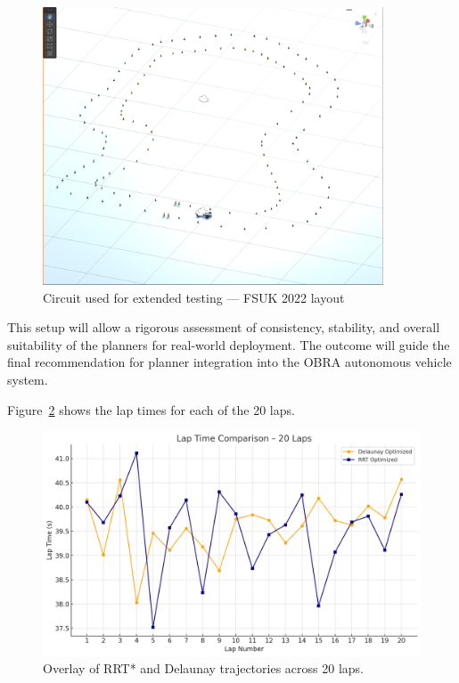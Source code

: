 \documentclass[a4paper,11pt]{report}
\begin{document}
\begin{figure}[H]
    \centering
    \includegraphics[width=0.90\textwidth]{Images/Track.png}
    \caption{Circuit used for extended testing — FSUK 2022 layout}
    \label{fig:track}
\end{figure}

This setup will allow a rigorous assessment of consistency, stability, 
and overall suitability of the planners for real-world deployment. 
The outcome will guide the final recommendation for planner integration 
into the OBRA autonomous vehicle system.

Figure~\ref{fig:overlay} shows the lap times for each of the 20 laps.
\begin{figure}[H]
    \centering
    \includegraphics[width=0.9\linewidth]{Images/RRTvsDELAUNAY.png}
    \caption{Overlay of RRT* and Delaunay trajectories across 20 laps.}
    \label{fig:overlay}
\end{figure}
\end{document}
